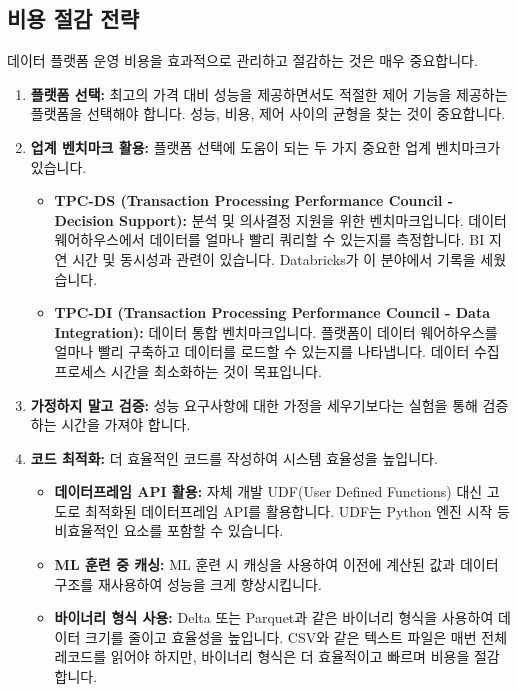 \documentclass[11pt,a4paper]{article}
\begin{document}
\subsection{비용 절감 전략}
데이터 플랫폼 운영 비용을 효과적으로 관리하고 절감하는 것은 매우 중요합니다.

\begin{enumerate}
    \item \textbf{플랫폼 선택:}
    최고의 가격 대비 성능을 제공하면서도 적절한 제어 기능을 제공하는 플랫폼을 선택해야 합니다. 성능, 비용, 제어 사이의 균형을 찾는 것이 중요합니다.

    \item \textbf{업계 벤치마크 활용:}
    플랫폼 선택에 도움이 되는 두 가지 중요한 업계 벤치마크가 있습니다.
    \begin{itemize}
        \item \textbf{TPC-DS (Transaction Processing Performance Council - Decision Support):} 분석 및 의사결정 지원을 위한 벤치마크입니다. 데이터 웨어하우스에서 데이터를 얼마나 빨리 쿼리할 수 있는지를 측정합니다. BI 지연 시간 및 동시성과 관련이 있습니다. Databricks가 이 분야에서 기록을 세웠습니다.
        \item \textbf{TPC-DI (Transaction Processing Performance Council - Data Integration):} 데이터 통합 벤치마크입니다. 플랫폼이 데이터 웨어하우스를 얼마나 빨리 구축하고 데이터를 로드할 수 있는지를 나타냅니다. 데이터 수집 프로세스 시간을 최소화하는 것이 목표입니다.
    \end{itemize}

    \item \textbf{가정하지 말고 검증:}
    성능 요구사항에 대한 가정을 세우기보다는 실험을 통해 검증하는 시간을 가져야 합니다.

    \item \textbf{코드 최적화:}
    더 효율적인 코드를 작성하여 시스템 효율성을 높입니다.
    \begin{itemize}
        \item \textbf{데이터프레임 API 활용:} 자체 개발 UDF(User Defined Functions) 대신 고도로 최적화된 데이터프레임 API를 활용합니다. UDF는 Python 엔진 시작 등 비효율적인 요소를 포함할 수 있습니다.
        \item \textbf{ML 훈련 중 캐싱:} ML 훈련 시 캐싱을 사용하여 이전에 계산된 값과 데이터 구조를 재사용하여 성능을 크게 향상시킵니다.
        \item \textbf{바이너리 형식 사용:} Delta 또는 Parquet과 같은 바이너리 형식을 사용하여 데이터 크기를 줄이고 효율성을 높입니다. CSV와 같은 텍스트 파일은 매번 전체 레코드를 읽어야 하지만, 바이너리 형식은 더 효율적이고 빠르며 비용을 절감합니다.
    \end{itemize}


\end{enumerate}
\end{document}
